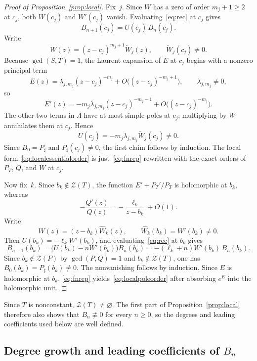 \documentclass[reqno]{article}
\theoremstyle{definition}
\theoremstyle{remark}
\theoremstyle{plain}
\newcommand{\Z}{\mathcal Z}
\begin{document}
\begin{proof}[Proof of Proposition~\ref{prop:local}]
Fix~$j$. Since $W$ has a zero of order $m_j+1\ge2$ at $c_j$, both $W(c_j)$ and $W'(c_j)$ vanish. Evaluating~\eqref{eq:rec} at $c_j$ gives
$$B_{n+1}(c_j)=U(c_j)\,B_n(c_j).$$
Write
$$W(z)=(z-c_j)^{m_j+1}\widetilde W_j(z),\qquad\widetilde W_j(c_j)\ne0.$$
Because $\gcd(S,T)=1$, the Laurent expansion of $E$ at $c_j$ begins with a nonzero principal term
$$E(z)=\lambda_{j,m_j}(z-c_j)^{-m_j}+O\bigl((z-c_j)^{-m_j+1}\bigr),\qquad\lambda_{j,m_j}\ne0,$$
so
$$E'(z)=-m_j\lambda_{j,m_j}(z-c_j)^{-m_j-1}+O\bigl((z-c_j)^{-m_j}\bigr).$$
The other two terms in $\Lambda$ have at most simple poles at $c_j$; multiplying by $W$ annihilates them at $c_j$. Hence
$$U(c_j)=-m_j\lambda_{j,m_j}\widetilde W_j(c_j)\ne0.$$
Since $B_0=P_\sharp$ and $P_\sharp(c_j)\ne0$, the first claim follows by induction. The local form~\eqref{eq:localessentialorder} is just~\eqref{eq:fnrep} rewritten with the exact orders of $P_T$, $Q$, and $W$ at $c_j$.

Now fix~$k$. Since $b_k\notin \Z(T)$, the function $E'+P_T'/P_T$ is holomorphic at $b_k$, whereas
$$-\frac{Q'(z)}{Q(z)}=-\frac{\ell_k}{z-b_k}+O(1).$$
Write
$$W(z)=(z-b_k)\widehat W_k(z),\qquad\widehat W_k(b_k)=W'(b_k)\ne0.$$
Then $U(b_k)=-\ell_k W'(b_k)$, and evaluating~\eqref{eq:rec} at $b_k$ gives
$$B_{n+1}(b_k)=\bigl(U(b_k)-nW'(b_k)\bigr)B_n(b_k)=-(\ell_k+n)W'(b_k)\,B_n(b_k).$$
Since $b_k\notin \Z(P)$ by $\gcd(P,Q)=1$ and $b_k\notin \Z(T)$, one has $B_0(b_k)=P_\sharp(b_k)\ne0$. The nonvanishing follows by induction. Since $E$ is holomorphic at $b_k$, \eqref{eq:fnrep} yields~\eqref{eq:localpoleorder} after absorbing $e^E$ into the holomorphic unit.
\end{proof}

Since $T$ is nonconstant, \(\Z(T)\ne\varnothing\). The first part of Proposition~\ref{prop:local} therefore also shows that \(B_n\not\equiv0\) for every \(n\ge0\), so the degrees and leading coefficients used below are well defined.

\subsection{Degree growth and leading coefficients of \texorpdfstring{$B_n$}{B\_n}}\label{sec:deg}
\end{document}

